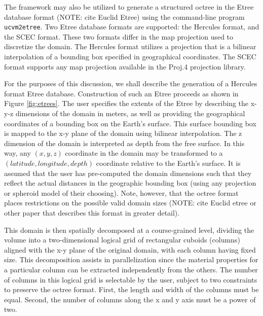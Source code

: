 The framework may also be utilized to generate a structured octree in the Etree database format (NOTE: cite Euclid Etree) using the command-line program \texttt{ucvm2etree}. Two Etree database formats are supported: the Hercules format, and the SCEC format. These two formats differ in the map projection used to discretize the domain. The Hercules format utilizes a projection that is a bilinear interpolation of a bounding box specified in geographical coordinates. The SCEC format supports any map projection available in the Proj.4 projection library.

For the purposes of this discussion, we shall describe the generation of a Hercules format Etree database. Construction of such an Etree proceeds as shown in Figure \ref{fig:etrees}. The user specifies the extents of the Etree by describing the x-y-z dimensions of the domain in meters, as well as providing the geographical coordinates of a bounding box on the Earth's surface. This surface bounding box is mapped to the x-y plane of the domain using bilinear interpolation. The z dimension of the domain is interpreted as depth from the free surface. In this way, any $(x,y,z)$ coordinate in the domain may be transformed to a $(latitude, longitude, depth)$ coordinate relative to the Earth's surface. It is assumed that the user has pre-computed the domain dimensions such that they reflect the actual distances in the geographic bounding box (using any projection or spheroid model of their choosing). Note, however, that the octree format places restrictions on the possible valid domain sizes (NOTE: cite Euclid etree or other paper that describes this format in greater detail).

This domain is then spatially decomposed at a course-grained level, dividing the volume into a two-dimensional logical grid of rectangular cuboids (columns) aligned with the x-y plane of the original domain, with each column having fixed size. This decomposition assists in parallelization since the material properties for a particular column can be extracted independently from the others. The number of columns in this logical grid is selectable by the user, subject to two constraints to preserve the octree format. First, the length and width of the columns must be equal. Second, the number of columns along the x and y axis must be a power of two.

